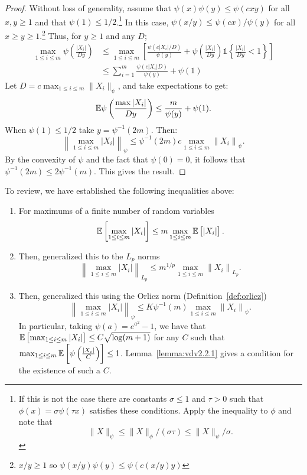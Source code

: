 \begin{proof}
	Without loss of generality, assume that  \(\psi(x)\psi(y)\leq \psi(cxy)\) for all \(x,y\geq 1\) and that \(\psi(1)\leq 1/2\).\footnote{If this is not the case there are constants \(\sigma \leq 1\) and \(\tau > 0\) such that  \(\phi(x)=\sigma\psi(\tau x)\) satisfies these conditions. Apply the inequality to  \(\phi\) and note that 
	 \[
		 \|X\|_\psi \leq  \|X\|_\phi/(\sigma\tau)\leq \|X\|_\psi/\sigma
	.\] }
	In this case, \(\psi(x/y)\leq \psi(cx)/\psi(y)\) for all \(x\geq y\geq 1\).\footnote{\(x/y \geq 1\) so \(\psi(x/y)\psi(y) \leq \psi\left(c(x/y)y\right)\)} Thus, for \(y\geq 1\) and any \(D\);
	\begin{align*}
	\max_{1\leq i\leq m}\psi\left(\frac{|X_i|}{Dy}\right) 
	&\leq \max_{1\leq i\leq m}\left[\frac{\psi(c|X_i|/D)}{\psi(y)} + \psi\left(\frac{|X_i|}{Dy}\right)\mathds{1}\left\{\frac{|X_i|}{Dy}<1\right\} \right] \\
	&\leq \sum_{i=1}^m \frac{\psi\left(c|X_i|D\right)}{\psi(y)} + \psi(1) 
	\end{align*}
	Let \(D = c\max_{1\leq i\leq m}\|X_i\|_\psi\), and take expectations to get:
	\[
	    \mathbb{E}\psi\left(\frac{\max|X_i|}{Dy}\right) \leq
		\frac{m}{\psi(y)} + \psi(1) 
	.\] 
	When \(\psi(1)\leq 1/2\) take \(y=\psi^{-1}(2m)\). Then: 
	\[
		\left\|\max_{1\leq i\leq m}\left|X_i\right|\right\|_\psi \leq \psi^{-1}(2m)c\max_{1\leq i\leq m}\left\|X_i\right\|_\psi
	.\] 
	By the convexity of \(\psi\) and the fact that  \(\psi(0)=0\), it follows that  \(\psi^{-1}(2m)\leq 2\psi^{-1}(m)\). This gives the result.
\end{proof}

To review, we have established the following inequalities above:
\begin{enumerate}
	\item For maximums of a finite number of random variables
	\[
		\mathbb{E}\left[\max_{1\leq i\leq m}\left|X_i\right|\right]\leq m \max_{1\leq i\leq m}\mathbb{E}\left[|X_i|\right]
	.\]
	\item Then, generalized this to the \(L_p\) norms 
	\[
		\left\|\max_{1\leq i\leq m}\left|X_i\right|\right\|_{L_p} \leq m^{1/p}\max_{1\leq i\leq m}\left\|X_i\right\|_{L_p}
	.\]
	\item Then, generalized this using the Orlicz norm (Definition~\ref{def:orlicz})
	\[
		\left\|\max_{1\leq i\leq m}|X_i|\right\|_\psi \leq K\psi^{-1}(m)\max_{1\leq i\leq m}\left\|X_i\right\|_\psi
	.\]
	In particular, taking \(\psi(a) = e^{a^2}-1\), we have that  \(\mathbb{E}\left[\max_{1\leq i\leq m}|X_i|\right] \leq C\sqrt{\log(m+1)}\) for any \(C\) such that  \(\max_{1\leq i\leq m}\mathbb{E}\left[\psi\left(\frac{|X_i|}{C}\right)\right]\leq 1\). Lemma~\ref{lemma:vdv2.2.1} gives a condition for the existence of such a \(C\).
\end{enumerate}


